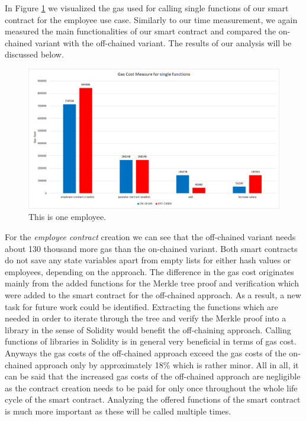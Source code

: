 In Figure \ref{fig:05_gas_cost_single} we visualized the gas used for calling single functions of our smart contract for the employee use case.
Similarly to our time measurement, we again measured the main functionalities of our smart contract and compared the on-chained variant with the off-chained variant.
The results of our analysis will be discussed below.

\begin{figure}[t]
\centering
\includegraphics[width=1.0\textwidth]{images/05_evaluation/05_gas_cost_single.png}
\caption{\label{fig:05_gas_cost_single}This is one employee.}
\end{figure}

For the \textit{employee contract} creation we can see that the off-chained variant needs about 130 thousand more gas than the on-chained variant.
Both smart contracts do not save any state variables apart from empty lists for either hash values or employees, depending on the approach.
The difference in the gas cost originates mainly from the added functions for the Merkle tree proof and verification which were added to the smart contract for the off-chained approach.
As a result, a new task for future work could be identified.
Extracting the functions which are needed in order to iterate through the tree and verify the Merkle proof into a library in the sense of Solidity would benefit the off-chaining approach.
Calling functions of libraries in Solidity is in general very beneficial in terms of gas cost.
Anyways the gas costs of the off-chained approach exceed the gas costs of the on-chained approach only by approximately 18\% which is rather minor.
All in all, it can be said that the increased gas costs of the off-chained approach are negligible as the contract creation needs to be paid for only once throughout the whole life cycle of the smart contract.
Analyzing the offered functions of the smart contract is much more important as these will be called multiple times.

